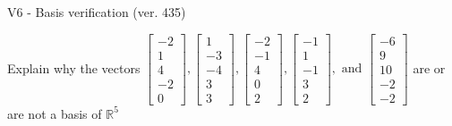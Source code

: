 \begin{exercise}
  \begin{exerciseTitle}V6 - Basis verification (ver. 435)\end{exerciseTitle}
  \begin{exerciseStatement}
    Explain why the vectors \(\left[\begin{array}{r}
-2 \\
1 \\
4 \\
-2 \\
0
\end{array}\right] , \left[\begin{array}{r}
1 \\
-3 \\
-4 \\
3 \\
3
\end{array}\right] , \left[\begin{array}{r}
-2 \\
-1 \\
4 \\
0 \\
2
\end{array}\right] , \left[\begin{array}{r}
-1 \\
1 \\
-1 \\
3 \\
2
\end{array}\right] , \text{ and } \left[\begin{array}{r}
-6 \\
9 \\
10 \\
-2 \\
-2
\end{array}\right]\) are or are not a basis of \(\mathbb{R}^5\)	



\end{exerciseStatement}
\end{exercise}
